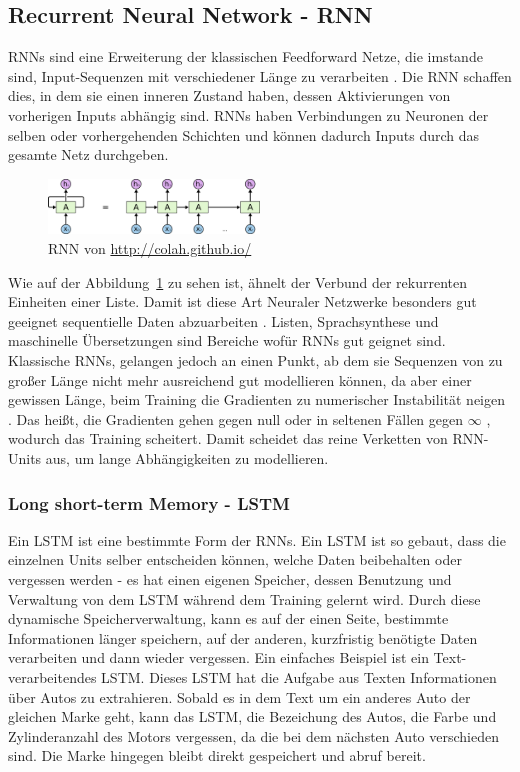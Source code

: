 \documentclass[pdftex,a4paper,halfparskip, article]{scrartcl}
\begin{document}
\subsection{Recurrent Neural Network - RNN}

RNNs sind eine Erweiterung der klassischen Feedforward Netze, die imstande sind, Input-Sequenzen mit verschiedener Länge zu verarbeiten \cite{paperGRUComparison}. Die RNN schaffen dies, in dem sie einen inneren Zustand haben, dessen Aktivierungen von vorherigen Inputs abhängig sind. 
RNNs haben Verbindungen zu Neuronen der selben oder vorhergehenden Schichten und können dadurch Inputs durch das gesamte Netz durchgeben. 

\begin{figure}[h]
\centering
\includegraphics[width=0.5\textwidth]{colah_rnn}
\caption{RNN von \url{http://colah.github.io/}}
\label{fig:rnn}
\end{figure}

Wie auf der Abbildung~\ref{fig:rnn} zu sehen ist, ähnelt der Verbund der rekurrenten Einheiten einer Liste. Damit ist diese Art Neuraler Netzwerke besonders gut geeignet sequentielle Daten abzuarbeiten \cite{colahsBlogLSTM}. Listen, Sprachsynthese und maschinelle Übersetzungen sind Bereiche wofür RNNs gut geignet sind. Klassische RNNs, gelangen jedoch an einen Punkt, ab dem sie Sequenzen von zu großer Länge nicht mehr ausreichend gut modellieren können, da aber einer gewissen Länge, beim Training die Gradienten zu numerischer Instabilität neigen \cite{DBLP:journals/corr/Graves13}. Das heißt, die Gradienten gehen gegen null oder in seltenen Fällen gegen $\infty$ \cite{paperGRUComparison}, wodurch das Training scheitert. Damit scheidet das reine Verketten von RNN-Units aus, um lange Abhängigkeiten zu modellieren. 

\subsubsection{Long short-term Memory - LSTM}

Ein LSTM ist eine bestimmte Form der RNNs. Ein LSTM ist so gebaut, dass die einzelnen Units selber entscheiden können, welche Daten beibehalten oder vergessen werden - es hat einen eigenen Speicher, dessen Benutzung und Verwaltung von dem LSTM während dem Training gelernt wird. Durch diese dynamische Speicherverwaltung, kann es auf der einen Seite, bestimmte Informationen länger speichern, auf der anderen, kurzfristig benötigte Daten verarbeiten und dann wieder vergessen. Ein einfaches Beispiel ist ein Text-verarbeitendes LSTM. Dieses LSTM hat die Aufgabe aus Texten Informationen über Autos zu extrahieren. Sobald es in dem Text um ein anderes Auto der gleichen Marke geht, kann das LSTM, die Bezeichung des Autos, die Farbe und Zylinderanzahl des Motors vergessen, da die bei dem nächsten Auto verschieden sind. Die Marke hingegen bleibt direkt gespeichert und abruf bereit. 
\end{document}
